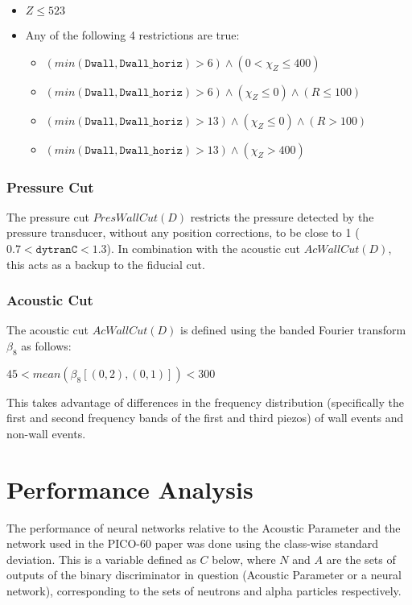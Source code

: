 \documentclass[10pt]{article}
\begin{document}
\begin{itemize}
    \item $Z \leq 523$
    \item Any of the following 4 restrictions are true:
    \begin{itemize}
        \item $(min(\texttt{Dwall}, \texttt{Dwall\_horiz}) > 6) \land (0 < \chi_{Z} \leq 400)$
        \item $(min(\texttt{Dwall}, \texttt{Dwall\_horiz}) > 6) \land (\chi_{Z} \leq 0) \land (R \leq 100)$
        \item $(min(\texttt{Dwall}, \texttt{Dwall\_horiz}) > 13) \land (\chi_{Z} \leq 0) \land (R > 100)$
        \item $(min(\texttt{Dwall}, \texttt{Dwall\_horiz}) > 13) \land (\chi_{Z} > 400)$
    \end{itemize}
\end{itemize}

\subsubsection{Pressure Cut}

The pressure cut $PresWallCut(D)$ restricts the pressure detected by the pressure transducer, without any position corrections, to be close to 1 ($0.7<\texttt{dytranC}<1.3$). In combination with the acoustic cut $AcWallCut(D)$, this acts as a backup to the fiducial cut.

\subsubsection{Acoustic Cut}

The acoustic cut $AcWallCut(D)$ is defined using the banded Fourier transform $\beta_{8}$ as follows:

$45 < mean(\beta_{8}[(0, 2), (0, 1)]) < 300$

This takes advantage of differences in the frequency distribution (specifically the first and second frequency bands of the first and third piezos) of wall events and non-wall events.

\section{Performance Analysis}

The performance of neural networks relative to the Acoustic Parameter and the network used in the PICO-60 paper was done using the class-wise standard deviation. This is a variable defined as $C$ below, where $N$ and $A$ are the sets of outputs of the binary discriminator in question (Acoustic Parameter or a neural network), corresponding to the sets of neutrons and alpha particles respectively.
\end{document}
